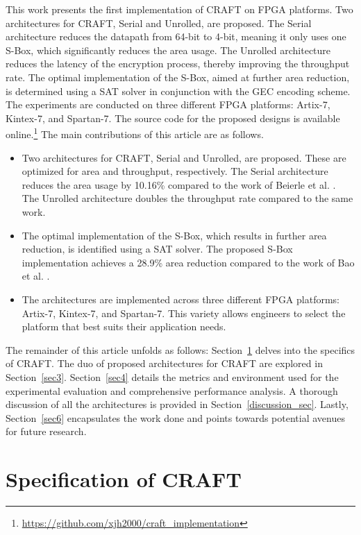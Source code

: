 \documentclass[final,5p,times,twocolumn]{elsarticle}
\begin{document}
This work presents the first implementation of CRAFT on FPGA platforms.
Two architectures for CRAFT, Serial and Unrolled, are proposed. The Serial architecture reduces the datapath from 64-bit to 4-bit, meaning it only uses one S-Box, which significantly reduces the area usage.
The Unrolled architecture reduces the latency of the encryption process, thereby improving the throughput rate.
The optimal implementation of the S-Box, aimed at further area reduction, is determined using a SAT solver in conjunction with the GEC encoding scheme.
The experiments are conducted on three different FPGA platforms: Artix-7, Kintex-7, and Spartan-7.
The source code for the proposed designs is available online.\footnote{\url{https://github.com/xjh2000/craft_implementation}}
The main contributions of this article are as follows.
\begin{itemize}
    \item Two architectures for CRAFT, Serial and Unrolled, are proposed. These are optimized for area and throughput, respectively.
          The Serial architecture reduces the area usage by 10.16\% compared to the work of Beierle et al. \cite{Beierle2019}.
          The Unrolled architecture doubles the throughput rate compared to the same work.
    \item The optimal implementation of the S-Box, which results in further area reduction, is identified using a SAT solver.
          The proposed S-Box implementation achieves a 28.9\% area reduction compared to the work of Bao et al. \cite{bao2019peigen}.
    \item The architectures are implemented across three different FPGA platforms: Artix-7, Kintex-7, and Spartan-7. This variety allows engineers to select the platform that best suits their application needs.
\end{itemize}


The remainder of this article unfolds as follows: Section~\ref{sec2} delves into the specifics of CRAFT. The duo of proposed architectures for CRAFT are explored in Section~\ref{sec3}. Section~\ref{sec4} details the metrics and environment used for the experimental evaluation and comprehensive performance analysis. A thorough discussion of all the architectures is provided in Section~\ref{discussion_sec}. Lastly, Section~\ref{sec6} encapsulates the work done and points towards potential avenues for future research.

\section{Specification of CRAFT}\label{sec2}
\end{document}
